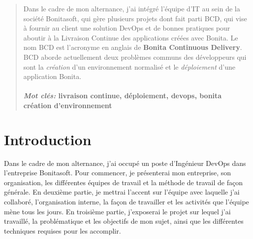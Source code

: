 \documentclass[12pt]{article}
\begin{document}
\begin{abstract}
\noindent
Dans le cadre de mon alternance, j'ai intégré l'équipe d’IT au sein de
la société Bonitasoft, qui gère plusieurs projets dont fait parti BCD, qui vise
à fournir au client une solution DevOps et de bonnes pratiques pour aboutir
à la Livraison Continue des applications créées avec Bonita.
Le nom BCD est l'acronyme en anglais de \textbf{Bonita Continuous Delivery}. \\
BCD aborde actuellement deux problèmes communs des développeurs qui sont la \emph{création}
d'un environnement normalisé et le \emph{déploiement} d'une application Bonita.\\ \\
\textbf{\textit{Mot clés:} livraison continue, déploiement, devops, bonita
création d’environnement}
\end{abstract}
\clearpage

\newpage
\setcounter{tocdepth}{2}
\tableofcontents
\newpage

\section{Introduction}
Dans le cadre de mon alternance, j'ai occupé un poste d'Ingénieur DevOps dans l'entreprise Bonitasoft.
Pour commencer, je présenterai mon entreprise, son organisation, les différentes équipes de travail et la méthode de travail de façon générale.
En deuxième partie, je mettrai l’accent sur l'équipe avec laquelle j'ai collaboré, l'organisation interne, la façon de travailler et les activités que l'équipe mène tous les jours.
En troisième partie, j'exposerai le projet sur lequel j'ai travaillé, la problématique et les objectifs de mon sujet, ainsi que les différentes techniques requises pour les accomplir.










\newpage
{}

\newpage


\newpage


\end{document}
